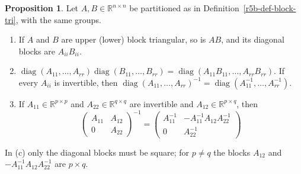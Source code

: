 \documentclass[12pt]{article}
\newcommand{\R}{\mathbb R}
\DeclareMathOperator{\diag}{diag}
\theoremstyle{definition}
\newtheorem{proposition}[theorem]{Proposition}
\begin{document}
\begin{proposition}\label{r5b-prop-block-tri}
Let \(A,B\in\R^{n\times n}\) be partitioned as in Definition~\ref{r5b-def-block-tri}, with the
same groups.
\begin{enumerate}
\item If \(A\) and \(B\) are upper (lower) block triangular, so is \(AB\), and its diagonal
blocks are \(A_{ii}B_{ii}\).
\item \(\diag(A_{11},\dots,A_{rr})\diag(B_{11},\dots,B_{rr})=\diag(A_{11}B_{11},\dots,A_{rr}B_{rr})\).
If every \(A_{ii}\) is invertible, then
\(\diag(A_{11},\dots,A_{rr})^{-1}=\diag(A_{11}^{-1},\dots,A_{rr}^{-1})\).
\item If \(A_{11}\in\R^{p\times p}\) and \(A_{22}\in\R^{q\times q}\) are invertible and
\(A_{12}\in\R^{p\times q}\), then
\[
\begin{pmatrix}A_{11}&A_{12}\\0&A_{22}\end{pmatrix}^{-1}
=\begin{pmatrix}A_{11}^{-1}&-A_{11}^{-1}A_{12}A_{22}^{-1}\\0&A_{22}^{-1}\end{pmatrix}
\]
\end{enumerate}
\end{proposition}
In (c) only the diagonal blocks must be square; for \(p\ne q\) the blocks \(A_{12}\) and
\(-A_{11}^{-1}A_{12}A_{22}^{-1}\) are \(p\times q\).
\end{document}
